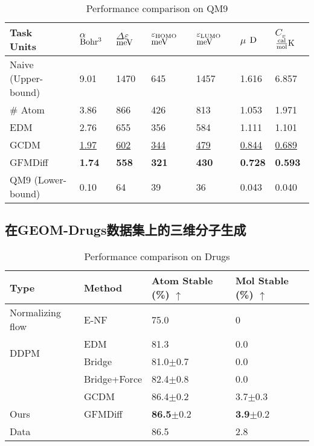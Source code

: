 \begin{table}[h]
    \centering
    \caption{Performance comparison on QM9}
    \label{tab:exp_qm9_condition}
    \begin{tabular}{lllllll}
    \hline
    \makecell[l]{Task\\Units} & \makecell[l]{$\alpha$\\${\rm Bohr^3}$} & \makecell[l]{$\Delta \varepsilon$\\${\rm meV}$} & \makecell[l]{$\varepsilon_{{\rm HOMO}}$\\${\rm meV}$} & \makecell[l]{$\varepsilon_{{\rm LUMO}}$\\${\rm meV}$} & \makecell[l]{$\mu$\\${\rm D}$} & \makecell[l]{$C_v$\\$\frac{{\rm cal}}{{\rm mol}}{\rm K}$} \\
    \hline
    Naive (Upper-bound) & 9.01 & 1470 & 645 & 1457 & 1.616 & 6.857 \\
    \# Atom & 3.86 & 866 & 426 & 813 & 1.053 & 1.971 \\
    EDM & 2.76 & 655 & 356 & 584 & 1.111 & 1.101 \\
    GCDM & \underline{1.97} & \underline{602} & \underline{344} & \underline{479} & \underline{0.844} & \underline{0.689} \\
    GFMDiff & \textbf{1.74} & \textbf{558} & \textbf{321} & \textbf{430} & \textbf{0.728} & \textbf{0.593} \\
    QM9 (Lower-bound) & 0.10 & 64 & 39 & 36 & 0.043 & 0.040 \\
    \hline
    \end{tabular}
\end{table}


\subsection{在GEOM-Drugs数据集上的三维分子生成}

\begin{table}[h]
    \centering
    \caption{Performance comparison on Drugs}
    \label{tab:exp_drugs}
    \begin{tabular}{llll}
    \hline
    Type & Method & Atom Stable (\%) $\uparrow$ & Mol Stable (\%) $\uparrow$ \\
    \hline
    Normalizing flow & E-NF & 75.0 & 0 \\
    \multirow{2}{*}{DDPM}
    & EDM  & 81.3 & 0.0 \\
    & Bridge & 81.0$\pm$0.7 & 0.0 \\
    & Bridge+Force & 82.4$\pm$0.8 & 0.0 \\
    & GCDM & 86.4$\pm$0.2 & 3.7$\pm$0.3 \\
    \hline
    Ours & GFMDiff & \textbf{86.5}$\pm$0.2 & \textbf{3.9}$\pm$0.2 \\
    \hline
    Data &  & 86.5 & 2.8 \\
    \hline
    \end{tabular}
\end{table}

